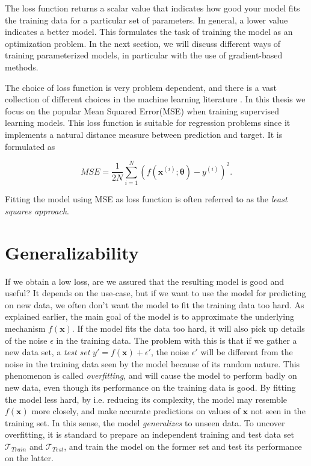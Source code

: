 The loss function returns a scalar value that indicates how good your model fits the training data for a particular set of parameters. In general, a lower value indicates a better model. This formulates the task of training the model as an optimization problem. In the next section, we will discuss different ways of training parameterized models, in particular with the use of gradient-based methods.

The choice of loss function is very problem dependent, and there is a vast collection of different choices in the machine learning literature \citet{hastie01statisticallearning}. In this thesis we focus on the popular Mean Squared Error(MSE) when training supervised learning models. This loss function is suitable for regression problems since it implements a natural distance measure between prediction and target. It is formulated as

\begin{equation}\label{eq:MSE}
    MSE = \frac{1}{2N}\sum_{i=1}^{N} (f(\boldsymbol{x}^{(i)}; \boldsymbol{\theta}) - y^{(i)})^2.
\end{equation}

Fitting the model using MSE as loss function is often referred to as the \emph{least squares approach}.

\section{Generalizability}\label{sec:Generalizability}
If we obtain a low loss, are we assured that the resulting model is good and useful? It depends on the use-case, but if we want to use the model for predicting on new data, we often don't want the model to fit the training data too hard. As explained earlier, the main goal of the model is to approximate the underlying mechanism $f(\boldsymbol{x})$. If the model fits the data too hard, it will also pick up details of the noise $\epsilon$ in the training data. The problem with this is that if we gather a new data set, a \emph{test set} $y' = f(\boldsymbol{x}) + \epsilon'$, the noise $\epsilon'$ will be different from the noise in the training data seen by the model because of its random nature. This phenomenon is called \emph{overfitting}, and will cause the model to perform badly on new data, even though its performance on the training data is good. By fitting the model less hard, by i.e. reducing its complexity, the model may resemble $f(\boldsymbol{x})$  more closely, and make accurate predictions on values of $\boldsymbol{x}$ not seen in the training set. In this sense, the model \emph{generalizes} to unseen data. To uncover overfitting, it is standard to prepare an independent training and test data set $\mathcal{T}_{Train}$ and $\mathcal{T}_{Test}$, and train the model on the former set and test its performance on the latter. 



